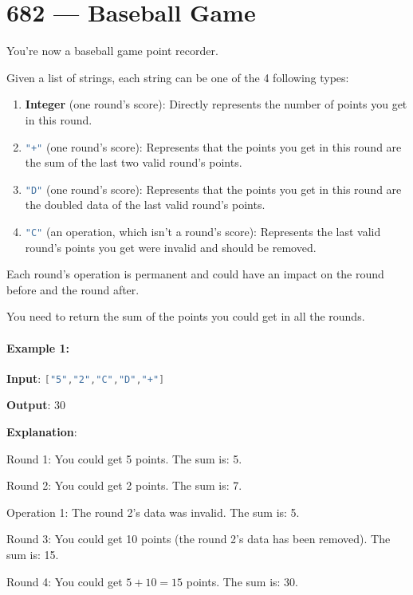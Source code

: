\section{682 --- Baseball Game}
You're now a baseball game point recorder.

Given a list of strings, each string can be one of the 4 following types:

\begin{enumerate}
\item \textbf{Integer} (one round's score): Directly represents the number of points you get in this round.
\item \lstinline[language=C++, basicstyle=\small\ttfamily, keywordstyle=\bfseries\color{green!40!black}]|"+"| (one round's score): Represents that the points you get in this round are the sum of the last two valid round's points.
\item \lstinline[language=C++, basicstyle=\small\ttfamily, keywordstyle=\bfseries\color{green!40!black}]|"D"| (one round's score): Represents that the points you get in this round are the doubled data of the last valid round's points.
\item \lstinline[language=C++, basicstyle=\small\ttfamily, keywordstyle=\bfseries\color{green!40!black}]|"C"| (an operation, which isn't a round's score): Represents the last valid round's points you get were invalid and should be removed.
\end{enumerate}
Each round's operation is permanent and could have an impact on the round before and the round after.

You need to return the sum of the points you could get in all the rounds.

\paragraph{Example 1:}
\begin{flushleft}


\textbf{Input}: \lstinline[language=C++, basicstyle=\small\ttfamily, keywordstyle=\bfseries\color{green!40!black}]|["5","2","C","D","+"]|

\textbf{Output}: 30

\textbf{Explanation}: 

Round 1: You could get 5 points. The sum is: 5.

Round 2: You could get 2 points. The sum is: 7.

Operation 1: The round 2's data was invalid. The sum is: 5.  

Round 3: You could get 10 points (the round 2's data has been removed). The sum is: 15.

Round 4: You could get $5 + 10 = 15$ points. The sum is: 30.
\end{flushleft}


